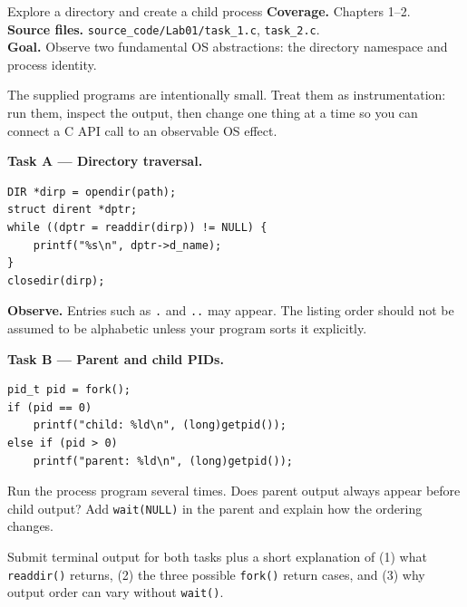 \begin{labproject}{Explore a directory and create a child process}
\textbf{Coverage.} Chapters 1--2.\\
\textbf{Source files.} \texttt{source\_code/Lab01/task\_1.c}, \texttt{task\_2.c}.\\
\textbf{Goal.} Observe two fundamental OS abstractions: the directory namespace and process identity.

\begin{labmode}
The supplied programs are intentionally small. Treat them as instrumentation: run them, inspect the output, then change one thing at a time so you can connect a C API call to an observable OS effect.
\end{labmode}

\medskip\noindent\textbf{Task A --- Directory traversal.}\par
\begin{lstlisting}[style=osc]
DIR *dirp = opendir(path);
struct dirent *dptr;
while ((dptr = readdir(dirp)) != NULL) {
    printf("%s\n", dptr->d_name);
}
closedir(dirp);
\end{lstlisting}

\textbf{Observe.} Entries such as \texttt{.} and \texttt{..} may appear. The listing order should not be assumed to be alphabetic unless your program sorts it explicitly.

\medskip\noindent\textbf{Task B --- Parent and child PIDs.}\par
\begin{lstlisting}[style=osc]
pid_t pid = fork();
if (pid == 0)
    printf("child: %ld\n", (long)getpid());
else if (pid > 0)
    printf("parent: %ld\n", (long)getpid());
\end{lstlisting}

\begin{tryit}
Run the process program several times. Does parent output always appear before child output? Add \texttt{wait(NULL)} in the parent and explain how the ordering changes.
\end{tryit}
\end{labproject}

\begin{labdeliverable}
Submit terminal output for both tasks plus a short explanation of (1) what \texttt{readdir()} returns, (2) the three possible \texttt{fork()} return cases, and (3) why output order can vary without \texttt{wait()}.
\end{labdeliverable}
